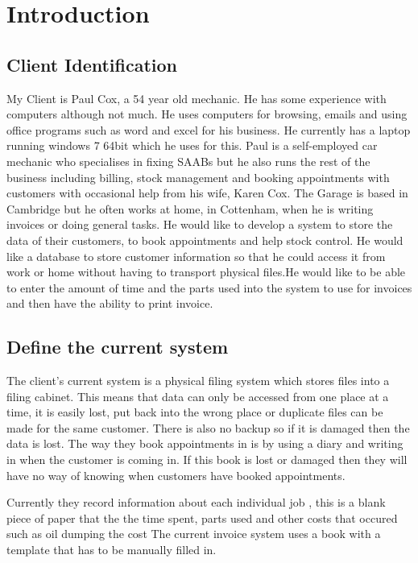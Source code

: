 \documentclass{article}
\begin{document}
\section{Introduction}


	\subsection{Client Identification}

 
		My Client is Paul Cox, a 54 year old mechanic. He has some experience with computers although not much. He uses computers for browsing, emails and using office programs 			such as word and excel for his business. He currently has a laptop running windows 7 64bit which he uses for this.
		Paul is a self-employed car mechanic who specialises in fixing SAABs but he also runs the rest of the business including billing, stock management and booking appointments with 			customers with occasional help from his wife, Karen Cox. 	
		The Garage is based in Cambridge but he often works at home, in Cottenham, when he is writing invoices or doing general tasks. 
		He would like to develop a system to store the data of their customers, to book appointments and help stock control.  He would like a database to store customer information so 			that he could access it from work or home without having to transport physical files.He would like to be able to enter the amount of time and the parts used into the system to use for invoices and then have the ability to print invoice.
		
		 \subsection{Define the current system}

		The client's current system is a physical filing system which stores files into a filing cabinet. This means that data can only be accessed from one place at a time, it is easily lost, 			put back into the wrong place or duplicate files can be made for the same customer.  
		There is also no backup so if it is damaged then the data is lost.  	
		The way they book appointments in is by using a diary and writing in when the customer is coming in. If this book is lost or damaged then they will have no way of knowing when customers have booked appointments. 
		
		Currently they record information about each individual job , this is a blank piece of paper that the the time spent, parts used and other costs that occured such as oil dumping the cost
		The current invoice system uses a book with a template that has to be manually filled in.
		
\end{document}
